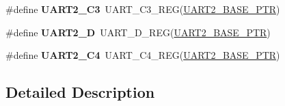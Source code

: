 \begin{DoxyCompactItemize}
\item 
\hypertarget{group___u_a_r_t___register___accessor___macros_gabf40e8391c305a9cfbd4a00ba732c5c8}{}\#define {\bfseries U\+A\+R\+T2\+\_\+\+C3}~U\+A\+R\+T\+\_\+\+C3\+\_\+\+R\+E\+G(\hyperlink{group___u_a_r_t___peripheral_ga75ca2ea4e490b3c1c7aa55fc9c25cd37}{U\+A\+R\+T2\+\_\+\+B\+A\+S\+E\+\_\+\+P\+T\+R})\label{group___u_a_r_t___register___accessor___macros_gabf40e8391c305a9cfbd4a00ba732c5c8}

\item 
\hypertarget{group___u_a_r_t___register___accessor___macros_ga92cfdefa4bbd5e6aceaad280e911b76b}{}\#define {\bfseries U\+A\+R\+T2\+\_\+\+D}~U\+A\+R\+T\+\_\+\+D\+\_\+\+R\+E\+G(\hyperlink{group___u_a_r_t___peripheral_ga75ca2ea4e490b3c1c7aa55fc9c25cd37}{U\+A\+R\+T2\+\_\+\+B\+A\+S\+E\+\_\+\+P\+T\+R})\label{group___u_a_r_t___register___accessor___macros_ga92cfdefa4bbd5e6aceaad280e911b76b}

\item 
\hypertarget{group___u_a_r_t___register___accessor___macros_gae087e956683e43bc1a108d3a71bd2c5c}{}\#define {\bfseries U\+A\+R\+T2\+\_\+\+C4}~U\+A\+R\+T\+\_\+\+C4\+\_\+\+R\+E\+G(\hyperlink{group___u_a_r_t___peripheral_ga75ca2ea4e490b3c1c7aa55fc9c25cd37}{U\+A\+R\+T2\+\_\+\+B\+A\+S\+E\+\_\+\+P\+T\+R})\label{group___u_a_r_t___register___accessor___macros_gae087e956683e43bc1a108d3a71bd2c5c}

\end{DoxyCompactItemize}


\subsection{Detailed Description}
